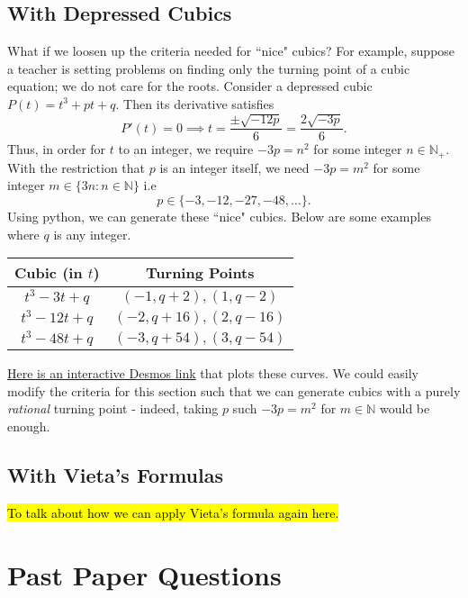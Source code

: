 \documentclass[12pt]{article}
\newcommand{\N}{\mathbb{N}}
\begin{document}
\subsection{With Depressed Cubics}
What if we loosen up the criteria needed for ``nice" cubics? For example, suppose a teacher is setting problems on finding only the turning point of a cubic equation; we do not care for the roots. Consider a depressed cubic $P(t) = t^3 + pt + q$. Then its derivative satisfies
\begin{equation*}
    P'(t) = 0 \implies t = \frac{\pm \sqrt{-12p}}{6} = \frac{2\sqrt{-3p}}{6}.
\end{equation*}
Thus, in order for $t$ to an integer, we require $-3p = n^2$ for some integer $n \in \N_+$. With the restriction that $p$ is an integer itself, we need $-3p = m^2$ for some integer $m \in \{3n : n \in \N\}$ i.e
\begin{equation*}
    p \in \{-3, -12, -27, -48, \dots\}.
\end{equation*}
Using python, we can generate these ``nice" cubics. Below are some examples where $q$ is any integer.
\begin{center}
\begin{tabular}{c|c}
Cubic (in $t$) & Turning Points\\
\hline 
$t^3 - 3t + q$ & $(-1, q + 2), (1, q - 2)$\\
$t^3 - 12t + q$ & $(-2, q + 16), (2, q - 16)$\\
$t^3 - 48t + q$ & $(-3, q + 54), (3, q - 54)$
\end{tabular}
\end{center}

\noindent \href{https://www.desmos.com/calculator/harieviric}{Here is an interactive Desmos link} that plots these curves. We could easily modify the criteria for this section such that we can generate cubics with a purely \textit{rational} turning point - indeed, taking $p$ such $-3p = m^2$ for $m \in \N$ would be enough.

\subsection{With Vieta's Formulas}
\hl{To talk about how we can apply Vieta's formula again here.}


\section{Past Paper Questions}
\end{document}
